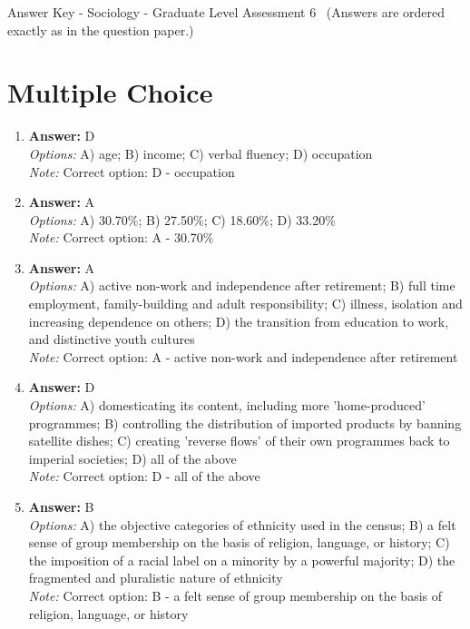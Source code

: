 \documentclass[12pt]{article}
\begin{document}
\begin{center}
Answer Key - Sociology - Graduate Level Assessment 6 \
\small (Answers are ordered exactly as in the question paper.)
\end{center}

\section*{Multiple Choice}
\begin{enumerate}[label=\arabic*.]
\item \textbf{Answer:} D
\\ \textit{Options:} A) age; B) income; C) verbal fluency; D) occupation
\\ \textit{Note:} Correct option: D - occupation
\item \textbf{Answer:} A
\\ \textit{Options:} A) 30.70\%; B) 27.50\%; C) 18.60\%; D) 33.20\%
\\ \textit{Note:} Correct option: A - 30.70\%
\item \textbf{Answer:} A
\\ \textit{Options:} A) active non-work and independence after retirement; B) full time employment, family-building and adult responsibility; C) illness, isolation and increasing dependence on others; D) the transition from education to work, and distinctive youth cultures
\\ \textit{Note:} Correct option: A - active non-work and independence after retirement
\item \textbf{Answer:} D
\\ \textit{Options:} A) domesticating its content, including more 'home-produced' programmes; B) controlling the distribution of imported products by banning satellite dishes; C) creating 'reverse flows' of their own programmes back to imperial societies; D) all of the above
\\ \textit{Note:} Correct option: D - all of the above
\item \textbf{Answer:} B
\\ \textit{Options:} A) the objective categories of ethnicity used in the census; B) a felt sense of group membership on the basis of religion, language, or history; C) the imposition of a racial label on a minority by a powerful majority; D) the fragmented and pluralistic nature of ethnicity
\\ \textit{Note:} Correct option: B - a felt sense of group membership on the basis of religion, language, or history
\end{enumerate}
\end{document}
